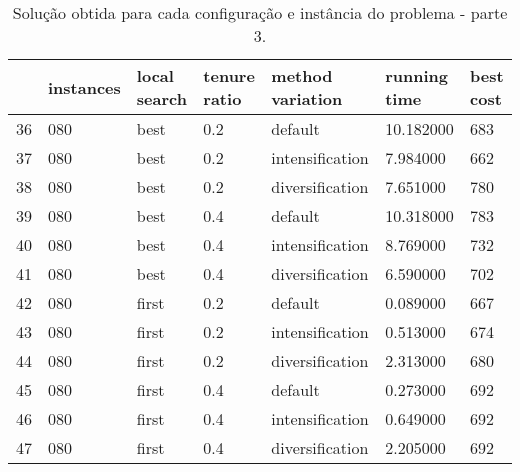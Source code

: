 \begin{landscape}
\begin{table}
\centering
\begin{tabular}{lllllll}
\toprule
{} & instances & local search & tenure ratio & method variation & running time & best cost \\
\midrule
36 &       080 &         best &          0.2 &          default &    10.182000 &       683 \\
37 &       080 &         best &          0.2 &  intensification &     7.984000 &       662 \\
38 &       080 &         best &          0.2 &  diversification &     7.651000 &       780 \\
39 &       080 &         best &          0.4 &          default &    10.318000 &       783 \\
40 &       080 &         best &          0.4 &  intensification &     8.769000 &       732 \\
41 &       080 &         best &          0.4 &  diversification &     6.590000 &       702 \\
42 &       080 &        first &          0.2 &          default &     0.089000 &       667 \\
43 &       080 &        first &          0.2 &  intensification &     0.513000 &       674 \\
44 &       080 &        first &          0.2 &  diversification &     2.313000 &       680 \\
45 &       080 &        first &          0.4 &          default &     0.273000 &       692 \\
46 &       080 &        first &          0.4 &  intensification &     0.649000 &       692 \\
47 &       080 &        first &          0.4 &  diversification &     2.205000 &       692 \\
\bottomrule
\end{tabular}
\caption{Solução obtida para cada configuração e instância do problema - parte 3.}
\label{table:all-data-3}
\end{table}


\end{landscape}
